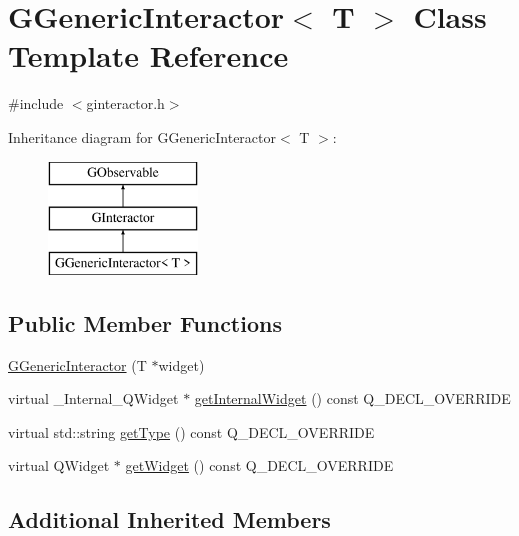 \hypertarget{classGGenericInteractor}{}\section{G\+Generic\+Interactor$<$ T $>$ Class Template Reference}
\label{classGGenericInteractor}


{\ttfamily \#include $<$ginteractor.\+h$>$}

Inheritance diagram for G\+Generic\+Interactor$<$ T $>$\+:\begin{figure}[H]
\begin{center}
\leavevmode
\includegraphics[height=3.000000cm]{classGGenericInteractor}
\end{center}
\end{figure}
\subsection*{Public Member Functions}
\begin{DoxyCompactItemize}
\item 
\mbox{\hyperlink{classGGenericInteractor_a37ec21e3f165cc593d7ee9892ec10967}{G\+Generic\+Interactor}} (T $\ast$widget)
\item 
virtual \+\_\+\+Internal\+\_\+\+Q\+Widget $\ast$ \mbox{\hyperlink{classGGenericInteractor_ad5de64ded8ff2a2e5af12bf6fccd2f93}{get\+Internal\+Widget}} () const Q\+\_\+\+D\+E\+C\+L\+\_\+\+O\+V\+E\+R\+R\+I\+DE
\item 
virtual std\+::string \mbox{\hyperlink{classGGenericInteractor_aed97d4fc36c9426c0e72cc12d48cf093}{get\+Type}} () const Q\+\_\+\+D\+E\+C\+L\+\_\+\+O\+V\+E\+R\+R\+I\+DE
\item 
virtual Q\+Widget $\ast$ \mbox{\hyperlink{classGGenericInteractor_aea59749a10df6f41058a9baa187d6225}{get\+Widget}} () const Q\+\_\+\+D\+E\+C\+L\+\_\+\+O\+V\+E\+R\+R\+I\+DE
\end{DoxyCompactItemize}
\subsection*{Additional Inherited Members}


